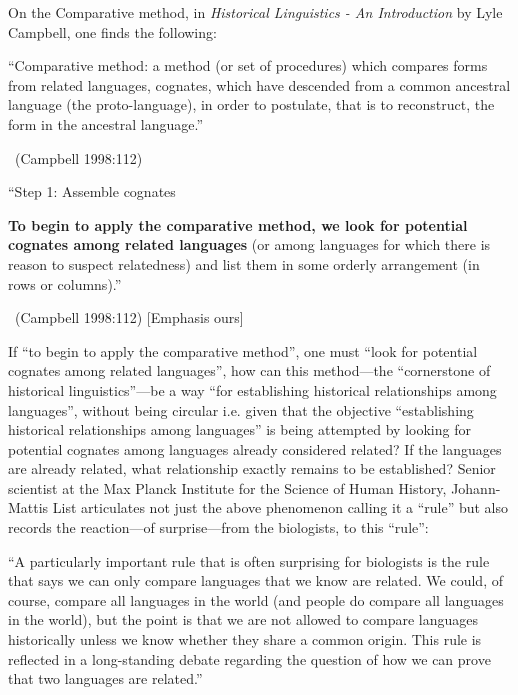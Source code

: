 On the Comparative method, in \textit{Historical Linguistics - An Introduction} by Lyle Campbell, one finds the following:

\begin{myquote}
“Comparative method: a method (or set of procedures) which compares forms from related languages, cognates, which have descended from a common ancestral language (the proto-language), in order to postulate, that is to reconstruct, the form in the ancestral language.” 

~\hfill (Campbell 1998:112)
\end{myquote}

\begin{myquote}
“Step 1: Assemble cognates
\end{myquote}

\begin{myquote}
\textbf{To begin to apply the comparative method, we look for potential cognates among related languages} (or among languages for which there is reason to suspect relatedness) and list them in some orderly arrangement (in rows or columns).” 

~\hfill (Campbell 1998:112) [Emphasis ours]
\end{myquote}

If “to begin to apply the comparative method”, one must “look for potential cognates among related languages”, how can this method—the “cornerstone of historical linguistics”—be a way “for establishing historical relationships among languages”, without being circular i.e. given that the objective “establishing historical relationships among languages” is being attempted by looking for potential cognates among languages already considered related? If the languages are already related, what relationship exactly remains to be established? Senior scientist at the Max Planck Institute for the Science of Human History, Johann-Mattis List articulates not just the above phenomenon calling it a “rule” but also records the reaction—of surprise—from the biologists, to this “rule”:

\begin{myquote}
“A particularly important rule that is often surprising for biologists is the rule that says we can only compare languages that we know are related. We could, of course, compare all languages in the world (and people do compare all languages in the world), but the point is that we are not allowed to compare languages historically unless we know whether they share a common origin. This rule is reflected in a long-standing debate regarding the question of how we can prove that two languages are related.”
\end{myquote}

